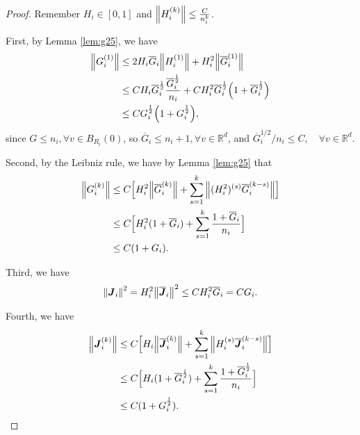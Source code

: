 \documentclass[a4paper, 11pt]{article}
\theoremstyle{plain}
\theoremstyle{remark}
\theoremstyle{definition}
\newcommand{\J}{\boldsymbol{J}}
\begin{document}
		\begin{proof}
			Remember $H_i\in [0,1]$  and $\norm{H_i^{(k)}}\leq \frac{C}{n_i^k}$.
			
			First, by Lemma \ref{lem:g25}, we have 
			\begin{equation}
				\begin{aligned}
					\norm{G_i^{(1)}}&\leq 2H_i\overline{G}_i \norm{H_i^{(1)}}+H_i^2\norm{\overline{G}^{(1)}_i}\\
					&\leq CH_i\overline{G}_i^{\frac{1}{2}} \frac{\overline{G}_i^{\frac{1}{2}}}{n_i}+CH_i^2\overline{G}^{\frac{1}{2}}_i\Big(1+\overline{G}^{\frac{1}{2}}_i\Big)\\
					&\leq CG_i^{\frac{1}{2}}\Big(1+G_i^{\frac{1}{2}}\Big),
				\end{aligned}
			\end{equation}
			since $G\leq n_i,\forall v\in B_{R_i}(0)$, so $\overline{G}_i\leq n_i+1,\forall v\in\mathbb{R}^d$, and 
			${\overline{G}_i^{{1}/{2}}}/{n_i}\leq C,\quad\forall v\in \mathbb{R}^d$.
			
			Second, by the Leibniz rule, we have by Lemma \ref{lem:g25} that
			\begin{equation}
				\begin{aligned}
					\norm{G_i^{(k)}}&\leq C\Big[H_i^2\norm{\overline{G}_i^{(k)}}+\sum_{s=1}^k\norm{(H_i^2)^{(s)}\overline{G}_i^{(k-s)}}\Big]\\
					&\leq C\Big[H_i^2(1+\overline{G}_i)+\sum_{s=1}^k\frac{1+\overline{G}_i}{n_i}\Big]\\
					&\leq C(1+G_i).
				\end{aligned}
			\end{equation}
			
			Third, we have
			\begin{eqnarray}
				\norm{\J_i}^2=H_i^2\norm{\overline{\J}_i}^2\leq CH_i^2\overline{G}_i=CG_i.
			\end{eqnarray}
			
			Fourth, we have
			\begin{eqnarray}
				\begin{aligned}
					\norm{\J_i^{(k)}}&\leq C\Big[H_i\norm{\overline{\J}_i^{(k)}}+\sum_{s=1}^k\norm{H_i^{(s)}\overline{\J}_i^{(k-s)}}\Big]\\
					&\leq C\Big[H_i(1+\overline{G}_i^{\frac{1}{2}})+\sum_{s=1}^k\frac{1+\overline{G}_i^{\frac{1}{2}}}{n_i}\Big]\\
					&\leq C(1+G_i^{\frac{1}{2}}).
				\end{aligned}
			\end{eqnarray}
		\end{proof}
		
\end{document}
